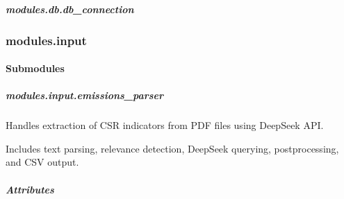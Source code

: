 \documentclass[letterpaper,10pt,english]{sphinxmanual}
\begin{document}
\sphinxstepscope


\subparagraph{modules.db.db\_connection}
\label{\detokenize{autoapi/modules/db/db_connection/index:module-modules.db.db_connection}}\label{\detokenize{autoapi/modules/db/db_connection/index:modules-db-db-connection}}\label{\detokenize{autoapi/modules/db/db_connection/index::doc}}
\sphinxstepscope


\subsubsection{modules.input}
\label{\detokenize{autoapi/modules/input/index:module-modules.input}}\label{\detokenize{autoapi/modules/input/index:modules-input}}\label{\detokenize{autoapi/modules/input/index::doc}}

\paragraph{Submodules}
\label{\detokenize{autoapi/modules/input/index:submodules}}
\sphinxstepscope


\subparagraph{modules.input.emissions\_parser}
\label{\detokenize{autoapi/modules/input/emissions_parser/index:module-modules.input.emissions_parser}}\label{\detokenize{autoapi/modules/input/emissions_parser/index:modules-input-emissions-parser}}\label{\detokenize{autoapi/modules/input/emissions_parser/index::doc}}
\sphinxAtStartPar
Handles extraction of CSR indicators from PDF files using DeepSeek API.

\sphinxAtStartPar
Includes text parsing, relevance detection, DeepSeek querying, postprocessing, and CSV output.


\subparagraph{Attributes}
\label{\detokenize{autoapi/modules/input/emissions_parser/index:attributes}}
\end{document}
